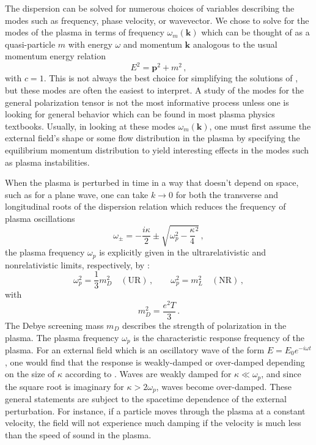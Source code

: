 The dispersion  can be solved for numerous choices of variables describing the modes such as frequency, phase velocity, or wavevector. We chose to solve for the modes of the plasma in terms of frequency $\omega_m (\mathbf{k})$ which can be thought of as a quasi-particle $m$ with energy $\omega$ and momentum $\mathbf{k}$ analogous to the usual momentum energy relation 
\begin{equation}
    E^2 = \boldsymbol{p}^2 +m^2\, ,
\end{equation}
with $c=1$. This is not always the best choice for simplifying the solutions of , but these modes are often the easiest to interpret. A study of the modes for the general polarization tensor is not the most informative process unless one is looking for general behavior which can be found in most plasma physics textbooks. Usually, in looking at these modes $\omega_m(\mathbf{k})$, one must first assume the external field's shape or some flow distribution in the plasma by specifying the equilibrium momentum distribution to yield interesting effects in the modes such as plasma instabilities.

When the plasma is perturbed in time in a way that doesn't depend on space, such as for a plane wave, one can take $k \to 0$ for both the transverse and longitudinal roots of the dispersion relation which reduces the frequency of plasma oscillations \cite{Formanek:2021blc,Grayson:2022asf}
\begin{equation}\label{plasmafreq}
    \omega_{\pm} = -\frac{i\kappa}{2} \pm \sqrt{\omega_p^2 - \frac{\kappa}{4}^2}\,,
\end{equation}
the plasma frequency $\omega_p$ is explicitly given in the ultrarelativistic and nonrelativistic limits, respectively, by \cite{Formanek:2021blc}:
\begin{equation}
\omega_p^2 = \frac{1}{3} m_D^2 \quad (\mathrm{UR})\,, \qquad \omega_p^2 = m_L^2 \quad (\mathrm{NR}) \,,
\end{equation}
with
\begin{equation}
    m_D^2 = \frac{e^2 T}{3}\,.
\end{equation}
The Debye screening mass $m_D$ describes the strength of polarization in the plasma. The plasma frequency $\omega_p$ is the characteristic response frequency of the plasma. For an external field which is an oscillatory wave of the form $E=E_0e^{-i\omega t}$, one would find that the response is weakly-damped or over-damped depending on the size of $\kappa$ according to . Waves are weakly damped for $\kappa \ll \omega_p$, and since the square root is imaginary for $\kappa > 2\omega_p$, waves become over-damped. These general statements are subject to the spacetime dependence of the external perturbation. For instance, if a particle moves through the plasma at a constant velocity, the field will not experience much damping if the velocity is much less than the speed of sound in the plasma.

